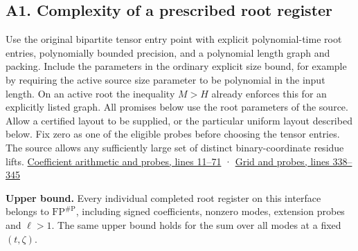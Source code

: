\documentclass[
  11pt,
]{article}
\begin{document}
\subsection{A1. Complexity of a prescribed root
register}\label{v9-a1-complexity-of-a-prescribed-root-register}

Use the original bipartite tensor entry point with explicit
polynomial-time root entries, polynomially bounded precision, and a
polynomial length graph and packing. Include the parameters in the
ordinary explicit size bound, for example by requiring the active source
size parameter to be polynomial in the input length. On an active root
the inequality \(M>H\) already enforces this for an explicitly listed
graph. All promises below use the root parameters of the source. Allow a
certified layout to be supplied, or the particular uniform layout
described below. Fix zero as one of the eligible probes before choosing
the tensor entries. The source allows any sufficiently large set of
distinct binary-coordinate residue lifts.
\href{https://github.com/openai/math/blob/main/preprints/The-Exponential-Time-Hypothesis-is-False-October-25-2026/build/quantitative-contraction.tex\#L11}{Coefficient
arithmetic and probes, lines 11--71} ·
\href{https://github.com/openai/math/blob/main/preprints/The-Exponential-Time-Hypothesis-is-False-October-25-2026/build/quantitative-contraction.tex\#L338}{Grid
and probes, lines 338--345}

\textbf{Upper bound.} Every individual completed root register on this
interface belongs to \(\mathrm{FP}^{\#\mathrm P}\), including signed
coefficients, nonzero modes, extension probes and \(\ell>1\). The same
upper bound holds for the sum over all modes at a fixed \((t,\zeta)\).
\end{document}
